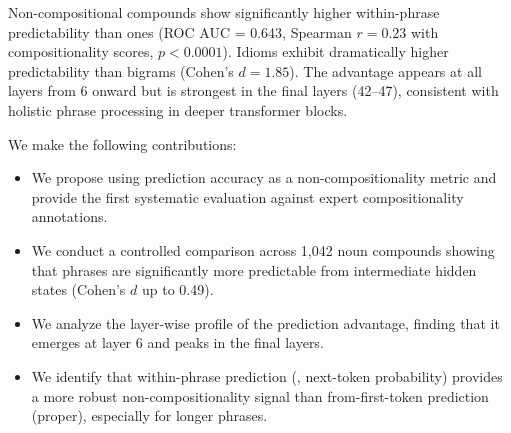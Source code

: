 Non-compositional compounds show significantly higher within-phrase predictability than \comp ones (ROC AUC = 0.643, Spearman $r = 0.23$ with compositionality scores, $p < 0.0001$).
Idioms exhibit dramatically higher predictability than \comp bigrams (Cohen's $d = 1.85$).
The \noncomp advantage appears at all layers from 6 onward but is strongest in the final layers (42--47), consistent with holistic phrase processing in deeper transformer blocks.

We make the following contributions:
\begin{itemize}[leftmargin=*,itemsep=0pt,topsep=0pt]
    \item We propose using \futurelens prediction accuracy as a non-compositionality metric and provide the first systematic evaluation against expert compositionality annotations.
    \item We conduct a controlled comparison across 1,042 noun compounds showing that \noncomp phrases are significantly more predictable from intermediate hidden states (Cohen's $d$ up to 0.49).
    \item We analyze the layer-wise profile of the \noncomp prediction advantage, finding that it emerges at layer 6 and peaks in the final layers.
    \item We identify that within-phrase prediction (\logitlens, next-token probability) provides a more robust non-compositionality signal than from-first-token prediction (\futurelens proper), especially for longer phrases.
\end{itemize}
